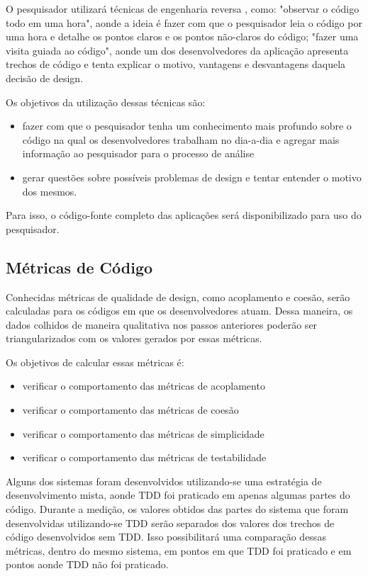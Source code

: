 O pesquisador utilizará técnicas de engenharia reversa \cite{eng-reversa}, como: "observar o código todo em uma hora",
aonde a ideia é fazer com que o pesquisador leia o código por uma hora e detalhe os pontos claros e os pontos não-claros do código; 
"fazer uma visita guiada ao código", aonde um dos desenvolvedores da aplicação apresenta trechos de código e tenta 
explicar o motivo, vantagens e desvantagens daquela decisão de design.

Os objetivos da utilização dessas técnicas são:

\begin{itemize}
	\item fazer com que o pesquisador tenha um conhecimento mais profundo sobre o código na qual os desenvolvedores trabalham no dia-a-dia e agregar mais informação ao pesquisador para o processo de análise
	\item gerar questões sobre possíveis problemas de design e tentar entender o motivo dos mesmos.
\end{itemize}

Para isso, o código-fonte completo das aplicações será disponibilizado para uso do pesquisador.

\subsection{Métricas de Código}
\label{sec:planejamento-estrategia-metricas}

Conhecidas métricas de qualidade de design, como acoplamento e coesão, serão calculadas para os códigos em que os desenvolvedores
atuam. Dessa maneira, os dados colhidos de maneira qualitativa nos passos anteriores poderão ser triangularizados com os valores gerados
por essas métricas.

Os objetivos de calcular essas métricas é:

\begin{itemize}
	\item verificar o comportamento das métricas de acoplamento
	\item verificar o comportamento das métricas de coesão
	\item verificar o comportamento das métricas de simplicidade
	\item verificar o comportamento das métricas de testabilidade
\end{itemize}

Alguns dos sistemas foram desenvolvidos utilizando-se uma estratégia de desenvolvimento mista, aonde TDD foi praticado em apenas algumas partes
do código. Durante a medição, os valores obtidos das partes do sistema que foram desenvolvidas utilizando-se TDD serão separados dos valores 
dos trechos de código desenvolvidos sem TDD. Isso possibilitará uma comparação dessas métricas, 
dentro do mesmo sistema, em pontos em que TDD foi praticado e em pontos aonde TDD não foi praticado.

